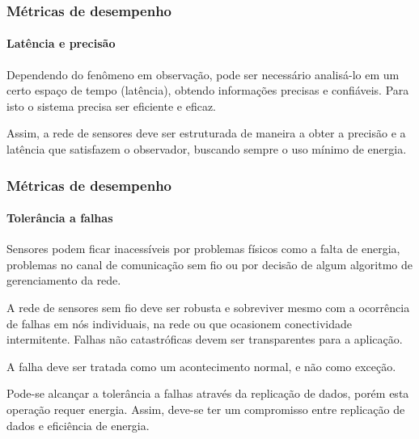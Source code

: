 \documentclass[notes]{beamer}
\begin{document}
\begin{frame}
\frametitle{Métricas de desempenho}
\framesubtitle{Latência e precisão}

\begin{block}

Dependendo do fenômeno em observação, pode ser necessário analisá-lo em um certo espaço de tempo (latência), obtendo informações precisas e confiáveis. Para isto o sistema precisa ser eficiente e eficaz.
\end{block} \pause

\begin{block}

Assim, a rede de sensores deve ser estruturada de maneira a obter a precisão e a latência que satisfazem o observador, buscando sempre o uso mínimo de energia. 

\end{block}

\end{frame}

\begin{frame}
\frametitle{Métricas de desempenho}
\framesubtitle{Tolerância a falhas}

\begin{block}

Sensores podem ficar inacessíveis por problemas físicos como a falta de energia, problemas no canal de comunicação sem fio ou por decisão de algum algoritmo de gerenciamento da rede.
\end{block} \pause

\begin{alertblock}

A rede de sensores sem fio deve ser robusta e sobreviver mesmo com a ocorrência de falhas em nós individuais, na rede ou que ocasionem conectividade intermitente. Falhas não catastróficas devem ser transparentes para a aplicação. 
\end{alertblock} \pause

\begin{alertblock}

A falha deve ser tratada como um acontecimento normal, e não como exceção.

\end{alertblock} \pause

\begin{block}

Pode-se alcançar a tolerância a falhas através da replicação de dados, porém esta operação requer energia. Assim, deve-se ter um compromisso entre replicação de dados e eficiência de energia.

\end{block} 

\end{frame}
\end{document}
